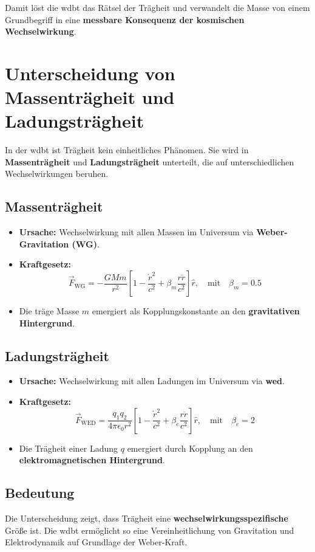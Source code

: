 Damit löst die \gls{wdbt} das Rätsel der Trägheit und verwandelt die Masse von einem Grundbegriff in eine \textbf{messbare Konsequenz der kosmischen Wechselwirkung}.

\section{Unterscheidung von Massenträgheit und Ladungsträgheit}

In der \gls{wdbt} ist Trägheit kein einheitliches Phänomen. Sie wird in \textbf{Massenträgheit} und \textbf{Ladungsträgheit} unterteilt, die auf unterschiedlichen Wechselwirkungen beruhen.

\subsection{Massenträgheit}
\begin{itemize}
    \item \textbf{Ursache:} Wechselwirkung mit allen Massen im Universum via \textbf{Weber-Gravitation (WG)}.
    \item \textbf{Kraftgesetz:}
        \[
        \vec{F}_{\text{WG}} = -\frac{G M m}{r^2} \left[ 1 - \frac{\dot{r}^2}{c^2} + \beta_m \frac{r \ddot{r}}{c^2} \right] \hat{r}, \quad \text{mit} \quad \beta_m = 0.5
        \]
    \item Die träge Masse $m$ emergiert als Kopplungskonstante an den \textbf{gravitativen Hintergrund}.
\end{itemize}

\subsection{Ladungsträgheit}
\begin{itemize}
    \item \textbf{Ursache:} Wechselwirkung mit allen Ladungen im Universum via \textbf{\gls{wed}}.
    \item \textbf{Kraftgesetz:}
        \[
        \vec{F}_{\text{WED}} = \frac{q_1 q_2}{4\pi\epsilon_0 r^2} \left[ 1 - \frac{\dot{r}^2}{c^2} + \beta_e \frac{r \ddot{r}}{c^2} \right] \hat{r}, \quad \text{mit} \quad \beta_e = 2
        \]
    \item Die Trägheit einer Ladung $q$ emergiert durch Kopplung an den \textbf{elektromagnetischen Hintergrund}.
\end{itemize}

\subsection{Bedeutung}
Die Unterscheidung zeigt, dass Trägheit eine \textbf{wechselwirkungsspezifische} Größe ist. Die \gls{wdbt} ermöglicht so eine Vereinheitlichung von Gravitation und Elektrodynamik auf Grundlage der
Weber-Kraft.

